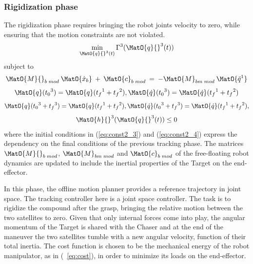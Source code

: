 \subsubsection{Rigidization phase}
\label{sec:rigidization}
%
The rigidization phase requires bringing the robot joints velocity to zero, while ensuring that the motion constraints are not violated. 
\begin{equation}
\min_{\MatO{q}{}^3(t)} \Gamma{}^{3}(\MatO{q}{}^3(t))
\end{equation}
subject to 
\begin{equation}
\MatO{M}{}_{b\;mod}\: \MatO{\dot{x}_{b}} \:+ \:\MatO{c}_{b\;mod}\:=\:-\MatO{M}_{bm\;mod} \: \MatO{\ddot{q}{}^1}
\label{eq:dyn_mod}
\end{equation}
\begin{equation}
\MatO{q}(t_{0}{}^{3})=\MatO{q}(t_f{}^1+t_{f}{}^{2}),
\MatO{\dot{q}}(t_{0}{}^{3})=\MatO{\dot{q}}(t_f{}^1+t_{f}{}^{2})
\label{eq:const2_3}
\end{equation}
\begin{equation}
\MatO{q}(t_{0}{}^{3}+t_{f}{}^{3})=\MatO{q}(t_f{}^1+t_{f}{}^{2}),
\MatO{\dot{q}}(t_{0}{}^{3}+t_{f}{}^{3})=\MatO{\dot{q}}(t_f{}^1+t_{f}{}^{2}),
\label{eq:const2_4}
\end{equation}
\begin{equation}
\MatO{h}{}^3(\MatO{q}{}^3(t)) \le 0
\label{eq:const3_3}
\end{equation}
where the initial conditions in (\ref{eq:const2_3}) and (\ref{eq:const2_4}) express the dependency on the final conditions of the previous tracking phase. The matrices $\MatO{M}{}_{b\;mod}$, $\MatO{M}_{bm\;mod}$ and $\MatO{c}_{b\;mod}$ of the free-floating robot dynamics are updated to include the inertial properties of the Target on the end-effector.

In this phase, the offline motion planner provides a reference trajectory in joint space. The  tracking controller here is a joint space controller. The task is to rigidize the compound after the grasp, bringing the relative motion between the two satellites to zero. Given that only internal forces come into play, the angular momentum of the Target is shared with the Chaser and at the end of the maneuver the two satellites tumble with a new angular velocity, function of their total inertia. The cost function is chosen to be the mechanical energy of the robot manipulator, as in (~\ref{eq:cost}), in order to minimize its loads on the end-effector.

